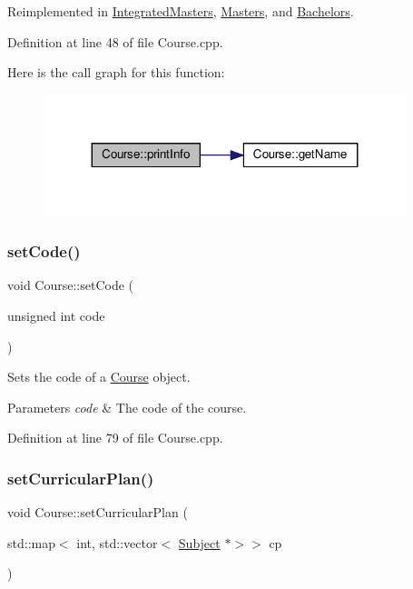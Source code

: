 Reimplemented in \hyperlink{classIntegratedMasters_a71d4f5089e42207af1106604e316f155}{Integrated\+Masters}, \hyperlink{classMasters_a72034d4ad86c3d62c755ad04228d09da}{Masters}, and \hyperlink{classBachelors_a25005e4fb6cfaddb749d13be04568c8b}{Bachelors}.



Definition at line 48 of file Course.\+cpp.

Here is the call graph for this function\+:\nopagebreak
\begin{figure}[H]
\begin{center}
\leavevmode
\includegraphics[width=299pt]{classCourse_a3248ecd5df196cf50ce379ec37758c59_cgraph}
\end{center}
\end{figure}
\mbox{\label{classCourse_a7aa38c1cf32c66b3c4307ff24d4e1f60}} 
\subsubsection{\texorpdfstring{set\+Code()}{setCode()}}
{\footnotesize\ttfamily void Course\+::set\+Code (\begin{DoxyParamCaption}\item[{unsigned int}]{code }\end{DoxyParamCaption})}

Sets the code of a \hyperlink{classCourse}{Course} object. 
\begin{DoxyParams}{Parameters}
{\em code} & The code of the course. \\
\hline
\end{DoxyParams}


Definition at line 79 of file Course.\+cpp.

\mbox{\label{classCourse_a84a9fd9d25660d52a5b0f58b7d4383bc}} 
\subsubsection{\texorpdfstring{set\+Curricular\+Plan()}{setCurricularPlan()}}
{\footnotesize\ttfamily void Course\+::set\+Curricular\+Plan (\begin{DoxyParamCaption}\item[{std\+::map$<$ int, std\+::vector$<$ \hyperlink{classSubject}{Subject} $\ast$$>$$>$}]{cp }\end{DoxyParamCaption})}

